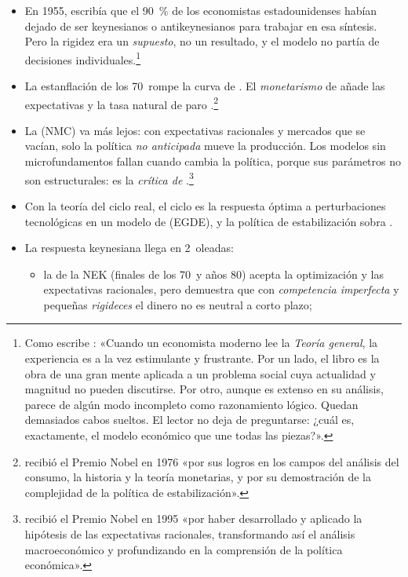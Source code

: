 \documentclass[11pt]{article}
\begin{document}
\begin{itemize}
\begin{itemize}
  \item En 1955, \textcite[212]{Samuelson1955Economics} escribía que el 90~\% de los economistas estadounidenses habían dejado de ser keynesianos o antikeynesianos para trabajar en esa síntesis. Pero la rigidez era un \emph{supuesto}, no un resultado, y el modelo no partía de decisiones individuales.\footnote{Como escribe \textcite{Mankiw2006Macroeconomist}: «Cuando un economista moderno lee la \emph{Teoría general}, la experiencia es a la vez estimulante y frustrante. Por un lado, el libro es la obra de una gran mente aplicada a un problema social cuya actualidad y magnitud no pueden discutirse. Por otro, aunque es extenso en su análisis, parece de algún modo incompleto como razonamiento lógico. Quedan demasiados cabos sueltos. El lector no deja de preguntarse: ¿cuál es, exactamente, el modelo económico que une todas las piezas?».}
  \item La estanflación de los 70~rompe la curva de . El \emph{monetarismo} de  añade las expectativas y la tasa natural de paro .\footnote{ recibió el Premio Nobel en 1976 «por sus logros en los campos del análisis del consumo, la historia y la teoría monetarias, y por su demostración de la complejidad de la política de estabilización»\nocite{Nobel1976Friedman}.}
  \item La  (NMC) va más lejos: con expectativas racionales\nocite{Muth1961Rational} y mercados que se vacían, solo la política \emph{no anticipada} mueve la producción\nocite{Lucas1972Expectations}. Los modelos sin microfundamentos fallan cuando cambia la política, porque sus parámetros no son estructurales: es la \emph{crítica de }\nocite{Lucas1976Econometric} .\footnote{ recibió el Premio Nobel en 1995 «por haber desarrollado y aplicado la hipótesis de las expectativas racionales, transformando así el análisis macroeconómico y profundizando en la comprensión de la política económica»\nocite{Nobel1995Lucas}.}
  \item Con la teoría del ciclo real\nocite{KydlandPrescott1982Time}, el ciclo es la respuesta óptima a perturbaciones tecnológicas en un modelo de  (EGDE), y la política de estabilización sobra .
  \item La respuesta keynesiana llega en 2~oleadas:
    \begin{itemize}
    \item la  de la NEK (finales de los 70~y años 80) acepta la optimización y las expectativas racionales, pero demuestra que con \emph{competencia imperfecta} y pequeñas \emph{rigideces} el dinero no es neutral a corto plazo;

\end{itemize}
\end{itemize}
\end{itemize}
\end{document}
